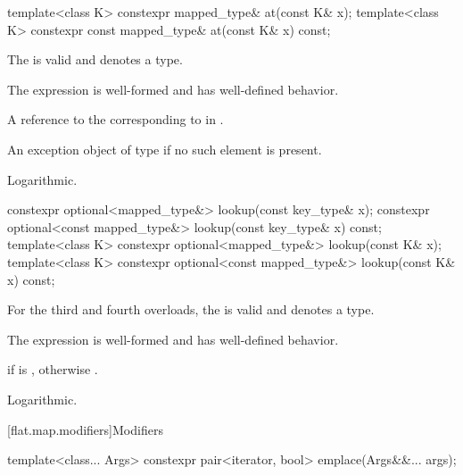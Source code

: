 %
\begin{itemdecl}
template<class K> constexpr mapped_type&       at(const K& x);
template<class K> constexpr const mapped_type& at(const K& x) const;
\end{itemdecl}

\begin{itemdescr}
\pnum
\constraints
The  
is valid and denotes a type.

\pnum
\expects
The expression  is well-formed and has well-defined behavior.

\pnum
\returns
A reference to the  corresponding to
 in .

\pnum
\throws
An exception object of type 
if no such element is present.

\pnum
\complexity
Logarithmic.
\end{itemdescr}

%
\begin{itemdecl}
constexpr optional<mapped_type&>       lookup(const key_type& x);
constexpr optional<const mapped_type&> lookup(const key_type& x) const;
template<class K> constexpr optional<mapped_type&>       lookup(const K& x);
template<class K> constexpr optional<const mapped_type&> lookup(const K& x) const;
\end{itemdecl}

\begin{itemdescr}
\pnum
\constraints
For the third and fourth overloads,
the  
is valid and denotes a type.

\pnum
\expects
The expression  is well-formed and has well-defined behavior.

\pnum
\returns
{} if  is ,
otherwise .

\pnum
\complexity
Logarithmic.
\end{itemdescr}

[flat.map.modifiers]{Modifiers}

%
\begin{itemdecl}
template<class... Args> constexpr pair<iterator, bool> emplace(Args&&... args);
\end{itemdecl}

